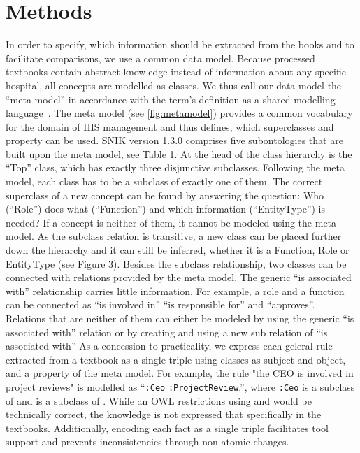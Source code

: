 \documentclass{IOS-Book-Article}     %
\newcommand{\citep}{\cite}%
\newcommand{\snikversion}{1.3.0}
\newcommand{\snikversionlink}{\href{https://github.com/snikproject/ontology/releases/tag/\snikversion}{\snikversion}}
\begin{document}
\section{Methods}

\vspace{-3pt}
In order to specify, which information should be extracted from the books and to facilitate comparisons, we use a common data model.
Because processed textbooks contain abstract knowledge instead of information about any specific hospital, all concepts are modelled as classes.
We thus call our data model the \enquote{meta model} in accordance with the term's definition as a shared modelling language~\citep[p.~8]{ob}.
The meta model (see \cref{fig:metamodel}) provides a common vocabulary for the domain of HIS management and thus defines, which superclasses and property can be used.
SNIK version \snikversionlink{} comprises five subontologies that are built upon the meta model, see Table 1.
At the head of the class hierarchy is the \enquote{Top} class, which has exactly three disjunctive subclasses.
%
Following the meta model, each class has to be a subclass of exactly one of them.
The correct superclass of a new concept can be found by answering the question: Who (\enquote{Role}) does what (\enquote{Function}) and which information (\enquote{EntityType}) is needed? If a concept is neither of them, it cannot be modeled using the meta model.
As the subclass relation is transitive, a new class can be placed further down the hierarchy and it can still be inferred, whether it is a Function, Role or EntityType (see Figure 3).
Besides the subclass relationship, two classes can be connected with relations provided by the meta model.
The generic \enquote{is associated with} relationship carries little information.
For example, a role and a function can be connected as \enquote{is involved in} \enquote{is responsible for} and \enquote{approves}.
Relations that are neither of them can either be modeled by using the generic \enquote{is associated with} relation or by creating and using a new sub relation of \enquote{is associated with}
%
As a concession to practicality, we express each geleral rule extracted from a textbook as a single triple using classes as subject and object, and a property of the meta model.
For example, the rule "the CEO is involved in project reviews" is modelled as \enquote{\texttt{:Ceo}  \texttt{:ProjectReview}.}, where \texttt{:Ceo} is a subclass of  and  is a subclass of .
While an OWL restrictions using  and  would be technically correct, the knowledge is not expressed that specifically in the textbooks.
Additionally, encoding each fact as a single triple facilitates tool support and prevents inconsistencies through non-atomic changes.
\end{document}
